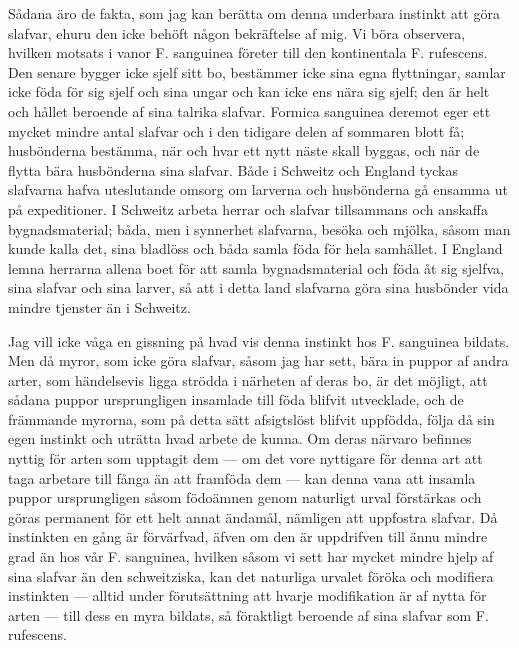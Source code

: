 Sådana äro de fakta, som jag kan berätta om denna underbara instinkt att göra slafvar, ehuru den icke behöft någon bekräftelse af mig. Vi böra observera, hvilken motsats i vanor F. sanguinea företer till den kontinentala F. rufescens. Den senare bygger icke sjelf sitt bo, bestämmer icke sina egna flyttningar, samlar icke föda för sig sjelf och sina ungar och kan icke ens nära sig sjelf; den är helt och hållet beroende af sina talrika slafvar. Formica sanguinea deremot eger ett mycket mindre antal slafvar och i den tidigare delen af sommaren blott få; husbönderna bestämma, när och hvar ett nytt näste skall byggas, och när de flytta bära husbönderna sina slafvar. Både i Schweitz och England tyckas slafvarna hafva uteslutande omsorg om larverna och husbönderna gå ensamma ut på expeditioner. I Schweitz arbeta herrar och slafvar tillsammans och anskaffa bygnadsmaterial; båda, men i synnerhet slafvarna, besöka och mjölka, såsom man kunde kalla det, sina bladlöss och båda samla föda för hela samhället. I England lemna herrarna allena boet för att samla bygnadsmaterial och föda åt sig sjelfva, sina slafvar och sina larver, så att i detta land slafvarna göra sina husbönder vida mindre tjenster än i Schweitz.

Jag vill icke våga en gissning på hvad vis denna instinkt hos F. sanguinea bildats. Men då myror, som icke göra slafvar, såsom jag har sett, bära in puppor af andra arter, som händelsevis ligga strödda i närheten af deras bo, är det möjligt, att sådana puppor ursprungligen insamlade till föda blifvit utvecklade, och de främmande myrorna, som på detta sätt afsigtslöst blifvit uppfödda, följa då sin egen instinkt och uträtta hvad arbete de kunna. Om deras närvaro befinnes nyttig för arten som upptagit dem — om det vore nyttigare för denna art att taga arbetare till fånga än att framföda dem — kan denna vana att insamla puppor ursprungligen såsom födoämnen genom naturligt urval förstärkas och göras permanent för ett helt annat ändamål, nämligen att uppfostra slafvar. Då instinkten en gång är förvärfvad, äfven om den är uppdrifven till ännu mindre grad än hos vår F. sanguinea, hvilken såsom vi sett har mycket mindre hjelp af sina slafvar än den schweitziska, kan det naturliga urvalet föröka och modifiera instinkten — alltid under förutsättning att hvarje modifikation är af nytta för arten — till dess en myra bildats, så föraktligt beroende af sina slafvar som F. rufescens.

